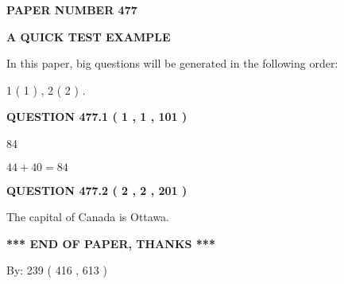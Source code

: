 \documentclass[12pt]{article}
\begin{document}
   
 {\textbf{ \Large{ PAPER NUMBER  477  }}}
   
   
\vspace{0.2in}
   
   
   
   
   
   
 \vspace{0.2in}
{\LARGE {\textbf{ A QUICK TEST EXAMPLE}}}
   
   
   
\vspace{0.2in}
   
In this paper, big questions will be generated in the following order: 
   
   
   1 ( 1 )
 ,
   2 ( 2 )
 .
  
\vspace{0.2in}
  
{\textbf{\Large{QUESTION
477.1 
 ( 1 , 1 , 101 )
}}}
  
  
 
 
\noindent{}

84
 
 
 
 
\noindent{}

$ %
44 +  %
40=   %
84$
 
 
  
\vspace{0.2in}
  
{\textbf{\Large{QUESTION
477.2 
 ( 2 , 2 , 201 )
}}}
  
  
 
 
\noindent{}
 
 
The capital of Canada is Ottawa.
 
 
 
 
   
   
 \vspace{0.2in}
 
   
   
   
   
\vspace{1.0in} 
{\textbf{\large{ *** END OF PAPER, THANKS *** }}} 
   
   
\hspace{1.0in} By: 
 239 ( 416 ,  613 )
   
\end{document}
